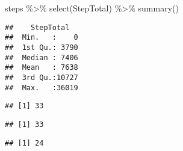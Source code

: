 \documentclass[
]{article}
\newenvironment{Shaded}{\begin{snugshade}}{\end{snugshade}}
\newcommand{\CommentTok}[1]{\textcolor[rgb]{0.56,0.35,0.01}{\textit{#1}}}
\newcommand{\FunctionTok}[1]{\textcolor[rgb]{0.00,0.00,0.00}{#1}}
\newcommand{\NormalTok}[1]{#1}
\newcommand{\OtherTok}[1]{\textcolor[rgb]{0.56,0.35,0.01}{#1}}
\newcommand{\SpecialCharTok}[1]{\textcolor[rgb]{0.00,0.00,0.00}{#1}}
\begin{document}
\begin{Shaded}
\begin{Highlighting}[]
\NormalTok{steps }\SpecialCharTok{\%\textgreater{}\%} 
  \FunctionTok{select}\NormalTok{(StepTotal) }\SpecialCharTok{\%\textgreater{}\%} 
  \FunctionTok{summary}\NormalTok{()}
\end{Highlighting}
\end{Shaded}

\begin{verbatim}
##    StepTotal    
##  Min.   :    0  
##  1st Qu.: 3790  
##  Median : 7406  
##  Mean   : 7638  
##  3rd Qu.:10727  
##  Max.   :36019
\end{verbatim}

\begin{Shaded}
\end{Shaded}

\begin{verbatim}
## [1] 33
\end{verbatim}

\begin{Shaded}
\end{Shaded}

\begin{verbatim}
## [1] 33
\end{verbatim}

\begin{Shaded}
\end{Shaded}

\begin{verbatim}
## [1] 24
\end{verbatim}
\end{document}
